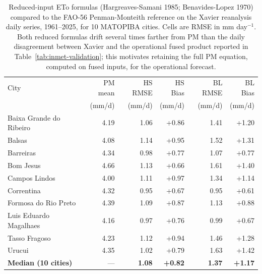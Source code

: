 \begin{table}[t]
\centering
\caption{Reduced-input ETo formulas (Hargreaves-Samani 1985; Benavides-Lopez 1970) compared to the FAO-56 Penman-Monteith reference \citep{Allen1998} on the Xavier reanalysis daily series, 1961--2025, for 10 MATOPIBA cities. Cells are RMSE in mm day$^{-1}$. Both reduced formulas drift several times farther from PM than the daily disagreement between Xavier and the operational fused product reported in Table~\ref{tab:inmet-validation}; this motivates retaining the full PM equation, computed on fused inputs, for the operational forecast.}
\label{tab:eto-alternatives}
\begin{tabular}{lrrrrr}
\toprule
City & PM mean & HS RMSE & HS Bias & BL RMSE & BL Bias \\
 & (mm/d) & (mm/d) & (mm/d) & (mm/d) & (mm/d) \\
\midrule
Baixa Grande do Ribeiro & 4.19 & 1.06 & +0.86 & 1.41 & +1.20 \\
Balsas & 4.08 & 1.14 & +0.95 & 1.52 & +1.31 \\
Barreiras & 4.34 & 0.98 & +0.77 & 1.07 & +0.77 \\
Bom Jesus & 4.66 & 1.13 & +0.66 & 1.61 & +1.40 \\
Campos Lindos & 4.00 & 1.11 & +0.97 & 1.34 & +1.14 \\
Correntina & 4.32 & 0.95 & +0.67 & 0.95 & +0.61 \\
Formosa do Rio Preto & 4.39 & 1.09 & +0.87 & 1.13 & +0.88 \\
Luis Eduardo Magalhaes & 4.16 & 0.97 & +0.76 & 0.99 & +0.67 \\
Tasso Fragoso & 4.23 & 1.12 & +0.94 & 1.46 & +1.28 \\
Urucui & 4.35 & 1.02 & +0.79 & 1.63 & +1.42 \\
\midrule
\textbf{Median (10 cities)} & --- & \textbf{1.08} & \textbf{+0.82} & \textbf{1.37} & \textbf{+1.17} \\
\bottomrule
\end{tabular}
\end{table}